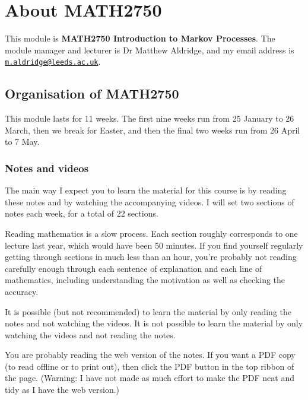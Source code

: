 \documentclass[
  a4paper,
]{article}
\theoremstyle{definition}
\theoremstyle{definition}
\theoremstyle{definition}
\theoremstyle{remark}
\begin{document}
\hypertarget{S00-about}{%
\section*{About MATH2750}\label{S00-about}}

This module is \textbf{MATH2750 Introduction to Markov Processes}. The module manager and lecturer is Dr Matthew Aldridge, and my email address is \href{mailto:m.aldridge@leeds.ac.uk}{\nolinkurl{m.aldridge@leeds.ac.uk}}.

\hypertarget{about-module}{%
\subsection*{Organisation of MATH2750}\label{about-module}}

This module lasts for 11 weeks. The first nine weeks run from 25 January to 26 March, then we break for Easter, and then the final two weeks run from 26 April to 7 May.

\hypertarget{notes}{%
\subsubsection*{Notes and videos}\label{notes}}

The main way I expect you to learn the material for this course is by reading these notes and by watching the accompanying videos. I will set two sections of notes each week, for a total of 22 sections.

Reading mathematics is a slow process. Each section roughly corresponds to one lecture last year, which would have been 50 minutes. If you find yourself regularly getting through sections in much less than an hour, you're probably not reading carefully enough through each sentence of explanation and each line of mathematics, including understanding the motivation as well as checking the accuracy.

It is possible (but not recommended) to learn the material by only reading the notes and not watching the videos. It is not possible to learn the material by only watching the videos and not reading the notes.

You are probably reading the web version of the notes. If you want a PDF copy (to read offline or to print out), then click the PDF button in the top ribbon of the page. (Warning: I have not made as much effort to make the PDF neat and tidy as I have the web version.)
\end{document}
